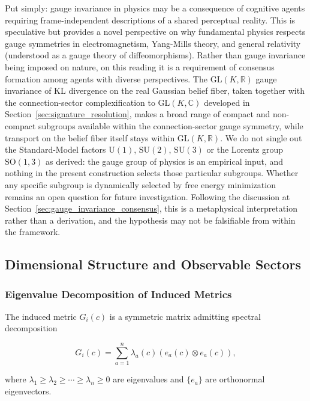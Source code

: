 \documentclass[11pt]{article}
\begin{document}
Put simply: gauge invariance in physics may be a consequence of cognitive agents requiring frame-independent descriptions of a shared perceptual reality. This is speculative but provides a novel perspective on why fundamental physics respects gauge symmetries in electromagnetism, Yang-Mills theory, and general relativity (understood as a gauge theory of diffeomorphisms). Rather than gauge invariance being imposed on nature, on this reading it is a requirement of consensus formation among agents with diverse perspectives. The $\mathrm{GL}(K, \mathbb{R})$ gauge invariance of KL divergence on the real Gaussian belief fiber, taken together with the connection-sector complexification to $\mathrm{GL}(K, \mathbb{C})$ developed in Section~\ref{sec:signature_resolution}, makes a broad range of compact and non-compact subgroups available within the connection-sector gauge symmetry, while transport on the belief fiber itself stays within $\mathrm{GL}(K, \mathbb{R})$. We do not single out the Standard-Model factors $\mathrm{U}(1)$, $\mathrm{SU}(2)$, $\mathrm{SU}(3)$ or the Lorentz group $\mathrm{SO}(1,3)$ as derived: the gauge group of physics is an empirical input, and nothing in the present construction selects those particular subgroups. Whether any specific subgroup is dynamically selected by free energy minimization remains an open question for future investigation. Following the discussion at Section~\ref{sec:gauge_invariance_consensus}, this is a metaphysical interpretation rather than a derivation, and the hypothesis may not be falsifiable from within the framework.

\subsection{Dimensional Structure and Observable Sectors}
\label{sec:observable_sectors}

\subsubsection{Eigenvalue Decomposition of Induced Metrics}

The induced metric $G_i(c)$ is a symmetric matrix admitting spectral decomposition

\begin{equation}
G_i(c) = \sum_{a=1}^n \lambda_a(c)  (e_a(c) \otimes e_a(c)),
\end{equation}

where $\lambda_1 \geq \lambda_2 \geq \cdots \geq \lambda_n \geq 0$ are eigenvalues and $\{e_a\}$ are orthonormal eigenvectors.
\end{document}
